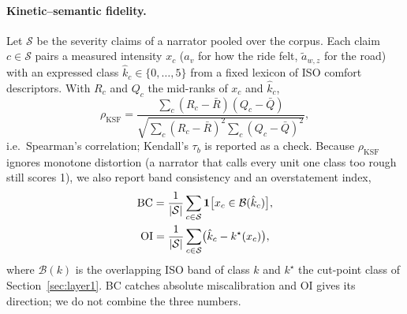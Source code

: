 \paragraph{Kinetic--semantic fidelity.}
Let $\mathcal S$ be the severity claims of a narrator pooled over the corpus.
Each claim $c\in\mathcal S$ pairs a measured intensity $x_c$ ($a_v$ for how the ride felt, $\tilde a_{w,z}$ for the road) with an expressed class $\hat k_c\in\{0,\dots,5\}$ from a fixed lexicon of ISO comfort descriptors.
With $R_c$ and $Q_c$ the mid-ranks of $x_c$ and $\hat k_c$,
\begin{equation}
\rho_{\mathrm{KSF}}=\frac{\sum_{c}(R_c-\bar R)(Q_c-\bar Q)}{\sqrt{\sum_{c}(R_c-\bar R)^2\sum_{c}(Q_c-\bar Q)^2}} ,
\end{equation}
i.e.\ Spearman's correlation; Kendall's $\tau_b$ is reported as a check.
Because $\rho_{\mathrm{KSF}}$ ignores monotone distortion (a narrator that calls every unit one class too rough still scores 1), we also report band consistency and an overstatement index,
\begin{gather}
\mathrm{BC}=\frac1{|\mathcal S|}\sum_{c\in\mathcal S}\mathbf{1}\bigl[x_c\in\mathcal B(\hat k_c)\bigr],\\
\mathrm{OI}=\frac1{|\mathcal S|}\sum_{c\in\mathcal S}\bigl(\hat k_c-k^\star(x_c)\bigr),
\end{gather}
where $\mathcal B(k)$ is the overlapping ISO band of class $k$ and $k^\star$ the cut-point class of Section~\ref{sec:layer1}.
BC catches absolute miscalibration and OI gives its direction; we do not combine the three numbers.

